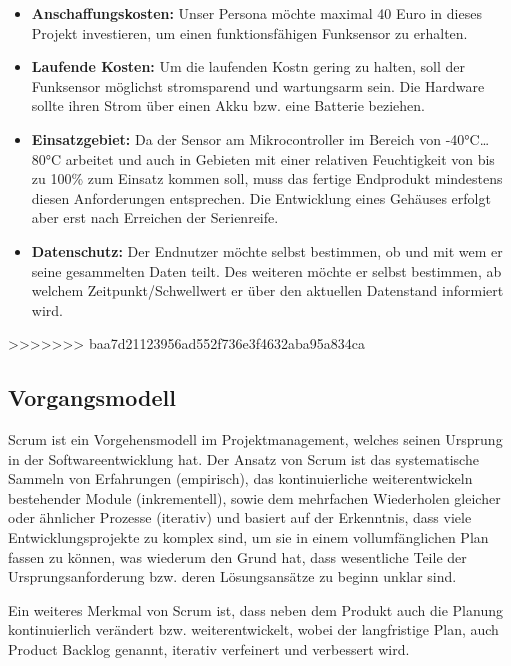  \begin{itemize} 
 	\item \textbf{Anschaffungskosten:} Unser Persona möchte maximal 40 Euro in dieses Projekt investieren, um einen funktionsfähigen Funksensor zu erhalten. 
 	
 	\item \textbf{Laufende Kosten:} Um die laufenden Kostn gering zu halten, soll der Funksensor möglichst stromsparend und wartungsarm sein. Die Hardware sollte ihren Strom über einen Akku bzw. eine Batterie beziehen.
 	
 	\item \textbf{Einsatzgebiet:} Da der Sensor am Mikrocontroller im Bereich von -40°C\dots80°C arbeitet und auch in Gebieten mit einer relativen Feuchtigkeit von bis zu 100\% zum Einsatz kommen soll, muss das fertige Endprodukt mindestens diesen Anforderungen entsprechen. Die Entwicklung eines Gehäuses erfolgt aber erst nach Erreichen der Serienreife.
 	
 	\item \textbf{Datenschutz:} Der Endnutzer möchte selbst bestimmen, ob und mit wem er seine gesammelten Daten teilt. Des weiteren möchte er selbst bestimmen, ab welchem Zeitpunkt/Schwellwert er über den aktuellen Datenstand informiert wird.
 
 \end{itemize}
>>>>>>> baa7d21123956ad552f736e3f4632aba95a834ca


\subsection{Vorgangsmodell} \label{Vorgangsmodell}
Scrum ist ein Vorgehensmodell im Projektmanagement, welches seinen Ursprung in der Softwareentwicklung hat.
Der Ansatz von Scrum ist das systematische Sammeln von Erfahrungen (empirisch), das kontinuierliche weiterentwickeln bestehender Module (inkrementell), sowie dem mehrfachen Wiederholen gleicher oder ähnlicher Prozesse (iterativ) und basiert auf der Erkenntnis, dass viele Entwicklungsprojekte zu komplex sind, um sie in einem vollumfänglichen Plan fassen zu können, was wiederum den Grund hat, dass wesentliche Teile der Ursprungsanforderung bzw. deren Lösungsansätze zu beginn unklar sind.

Ein weiteres Merkmal von Scrum ist, dass neben dem Produkt auch die Planung kontinuierlich verändert bzw. weiterentwickelt, wobei der langfristige Plan, auch Product Backlog genannt, iterativ verfeinert und verbessert wird.

